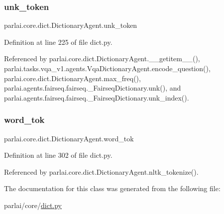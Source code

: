 \subsubsection{\texorpdfstring{unk\+\_\+token}{unk\_token}}
{\footnotesize\ttfamily parlai.\+core.\+dict.\+Dictionary\+Agent.\+unk\+\_\+token}



Definition at line 225 of file dict.\+py.



Referenced by parlai.\+core.\+dict.\+Dictionary\+Agent.\+\_\+\+\_\+getitem\+\_\+\+\_\+(), parlai.\+tasks.\+vqa\+\_\+v1.\+agents.\+Vqa\+Dictionary\+Agent.\+encode\+\_\+question(), parlai.\+core.\+dict.\+Dictionary\+Agent.\+max\+\_\+freq(), parlai.\+agents.\+fairseq.\+fairseq.\+\_\+\+Fairseq\+Dictionary.\+unk(), and parlai.\+agents.\+fairseq.\+fairseq.\+\_\+\+Fairseq\+Dictionary.\+unk\+\_\+index().

\mbox{\label{classparlai_1_1core_1_1dict_1_1DictionaryAgent_a025ffc815b72c6d2d34c12249956d4f1}} 
\subsubsection{\texorpdfstring{word\+\_\+tok}{word\_tok}}
{\footnotesize\ttfamily parlai.\+core.\+dict.\+Dictionary\+Agent.\+word\+\_\+tok}



Definition at line 302 of file dict.\+py.



Referenced by parlai.\+core.\+dict.\+Dictionary\+Agent.\+nltk\+\_\+tokenize().



The documentation for this class was generated from the following file\+:\begin{DoxyCompactItemize}
\item 
parlai/core/\hyperlink{dict_8py}{dict.\+py}\end{DoxyCompactItemize}
